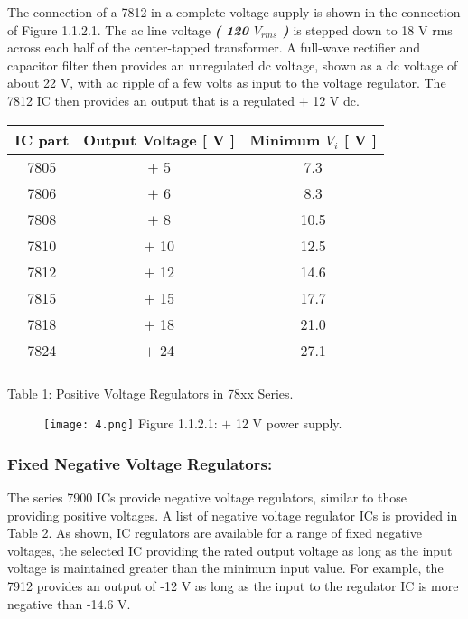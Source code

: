 \begin{multicols}{2} \hfill \break
The connection of a 7812 in a complete voltage supply is shown in the connection of Figure 1.1.2.1. The ac line voltage {\bfseries\itshape ( 120 $V_{rms}$ )} is stepped down to 18 V rms across each half of the center-tapped transformer. A full-wave rectifier and capacitor filter then provides an unregulated dc voltage, shown as a dc voltage of about 22 V, with ac ripple of a few volts as input to the voltage regulator. The 7812 IC then provides an output that is a regulated $+$ 12 V dc.

\begin{center}
{\small
\begin{tabular}[.5cm]{c c c}
\toprule
IC part & Output Voltage [ V ] & Minimum $V_{i}$ [ V ] \\
\midrule
7805 & $+$ 5 & 7.3 \\
\cmidrule{1-3}
7806 & $+$ 6 & 8.3 \\
\cmidrule{1-3}
7808 & $+$ 8 & 10.5 \\
\cmidrule{1-3}
7810 & $+$ 10 & 12.5 \\
\cmidrule{1-3}
7812 & $+$ 12 & 14.6 \\
\cmidrule{1-3}
7815 & $+$ 15 & 17.7 \\
\cmidrule{1-3}
7818 & $+$ 18 & 21.0 \\
\cmidrule{1-3}
7824 & $+$ 24 & 27.1 \\
\bottomrule
\linebreak
\end{tabular}}
\linebreak Table 1: Positive Voltage Regulators in 78xx Series.
\end{center}
\end{multicols}

\begin{figure}[H]
\texttt{[image: 4.png]}
\centering \linebreak \linebreak Figure 1.1.2.1:  $+$ 12 V power supply.
\end{figure}

\pagebreak

\subsubsection{Fixed Negative Voltage Regulators:}

The series 7900 ICs provide negative voltage regulators, similar to those providing positive voltages. A list of negative voltage regulator ICs is provided in Table 2. As shown, IC regulators are available for a range of fixed negative voltages, the selected IC providing the rated output voltage as long as the input voltage is maintained greater than the minimum input value. For example, the 7912 provides an output of -12 V as long as the input to the regulator IC is more negative than -14.6 V.

